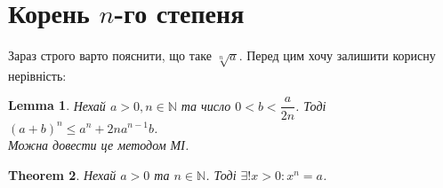 \documentclass[a4paper, 14pt]{article}
\theoremstyle{theoremdd}
\newtheorem{theorem}{Theorem}[subsection]
\theoremstyle{theoremdd}
\theoremstyle{theoremdd}
\theoremstyle{theoremdd}
\theoremstyle{theoremdd}
\theoremstyle{theoremdd}
\theoremstyle{theoremdd}
\newtheorem{lemma}[theorem]{Lemma}
\theoremstyle{theoremdd}
\begin{document}
	\setcounter{section}{0}	
	\section*{Корень $n$-го степеня}
	Зараз строго варто пояснити, що таке $\sqrt[n]{a}$. Перед цим хочу залишити корисну нерівність:
	
	\begin{lemma}
	Нехай $a > 0, n \in \mathbb{N}$ та число $0 < b < \dfrac{a}{2n}$. Тоді $(a+b)^n \leq a^n + 2na^{n-1}b$.\\
	\textit{Можна довести це методом МІ}.
	\end{lemma}
	
	\begin{theorem}
	Нехай $a > 0$ та $n \in \mathbb{N}$. Тоді $\exists ! x > 0: x^n = a$.
	\end{theorem}
	
\end{document}
